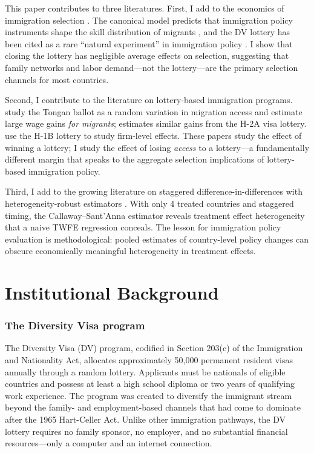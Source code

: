 \documentclass[12pt]{article}
\begin{document}
This paper contributes to three literatures. First, I add to the economics of immigration selection \citep{Borjas1987, Chiswick1999, GroggerH2011}. The canonical model predicts that immigration policy instruments shape the skill distribution of migrants \citep{Borjas1999}, and the DV lottery has been cited as a rare ``natural experiment'' in immigration policy \citep{McKenzie2010}. I show that closing the lottery has negligible average effects on selection, suggesting that family networks and labor demand---not the lottery---are the primary selection channels for most countries.

Second, I contribute to the literature on lottery-based immigration programs. \citet{McKenzie2010} study the Tongan ballot as a random variation in migration access and estimate large wage gains \textit{for migrants}; \citet{Clemens2013} estimates similar gains from the H-2A visa lottery. \citet{Doran2022} use the H-1B lottery to study firm-level effects. These papers study the effect of winning a lottery; I study the effect of losing \textit{access} to a lottery---a fundamentally different margin that speaks to the aggregate selection implications of lottery-based immigration policy.

Third, I add to the growing literature on staggered difference-in-differences with heterogeneity-robust estimators \citep{CallawayS2021, SunA2021, GoodmanBacon2021}. With only 4 treated countries and staggered timing, the Callaway--Sant'Anna estimator reveals treatment effect heterogeneity that a naive TWFE regression conceals. The lesson for immigration policy evaluation is methodological: pooled estimates of country-level policy changes can obscure economically meaningful heterogeneity in treatment effects.

\section{Institutional Background}

\subsubsection*{The Diversity Visa program} The Diversity Visa (DV) program, codified in Section 203(c) of the Immigration and Nationality Act, allocates approximately 50,000 permanent resident visas annually through a random lottery. Applicants must be nationals of eligible countries and possess at least a high school diploma or two years of qualifying work experience. The program was created to diversify the immigrant stream beyond the family- and employment-based channels that had come to dominate after the 1965 Hart-Celler Act. Unlike other immigration pathways, the DV lottery requires no family sponsor, no employer, and no substantial financial resources---only a computer and an internet connection.
\end{document}
